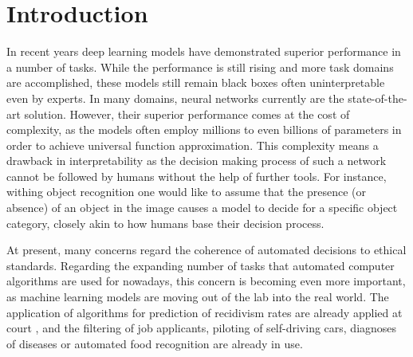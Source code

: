 \section{Introduction}
\label{sec:introduction}

In recent years deep learning models have demonstrated superior performance in a number of tasks. While the performance is still rising and more task domains are accomplished, these models still remain black boxes often uninterpretable even by experts. 
In many domains, neural networks currently are the state-of-the-art solution. However, their superior performance comes at the cost of complexity, as the models often employ millions to even billions of parameters in order to achieve universal function approximation. This complexity means a drawback in interpretability as the decision making process of such a network cannot be followed by humans without the help of further tools. For instance, withing object recognition one would like to assume that the presence (or absence) of an object in the image causes a model to decide for a specific object category, closely akin to how humans base their decision process. 

At present, many concerns regard the coherence of automated decisions to ethical standards. Regarding the expanding number of tasks that automated computer algorithms are used for nowadays, this concern is becoming even more important, as machine learning models are moving out of the lab into the real world. The application of algorithms for prediction of recidivism rates are already applied at court \cite{chouldechova2017fair}, and the filtering of job applicants, piloting of self-driving cars, diagnoses of diseases or automated food recognition \cite{ruede2020multi} are already in use.






